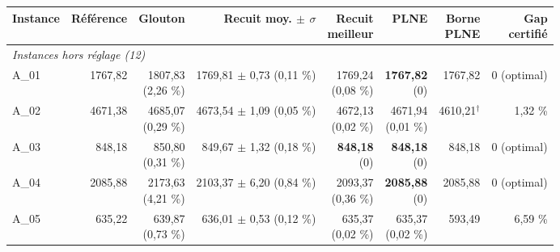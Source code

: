 \begin{tabular}{lrrrrrrr}
\toprule
Instance & Référence & Glouton & \makecell{Recuit\\ moy. $\pm$ $\sigma$} & \makecell{Recuit\\ meilleur} & PLNE & \makecell{Borne\\ PLNE} & \makecell{Gap\\ certifié} \\
\midrule
\multicolumn{8}{l}{\textit{Instances hors réglage (12)}} \\
\midrule
A\_01 & 1767,82 & \makecell{1807,83\\ \footnotesize(2,26 \%)} & \makecell{1769,81 $\pm$ 0,73\\ \footnotesize(0,11 \%)} & \makecell{1769,24\\ \footnotesize(0,08 \%)} & \makecell{\textbf{1767,82}\\ \footnotesize(0)} & 1767,82 & 0 (optimal) \\
A\_02 & 4671,38 & \makecell{4685,07\\ \footnotesize(0,29 \%)} & \makecell{4673,54 $\pm$ 1,09\\ \footnotesize(0,05 \%)} & \makecell{4672,13\\ \footnotesize(0,02 \%)} & \makecell{4671,94\\ \footnotesize(0,01 \%)} & 4610,21$^\dagger$ & 1,32 \% \\
A\_03 & 848,18 & \makecell{850,80\\ \footnotesize(0,31 \%)} & \makecell{849,67 $\pm$ 1,32\\ \footnotesize(0,18 \%)} & \makecell{\textbf{848,18}\\ \footnotesize(0)} & \makecell{\textbf{848,18}\\ \footnotesize(0)} & 848,18 & 0 (optimal) \\
A\_04 & 2085,88 & \makecell{2173,63\\ \footnotesize(4,21 \%)} & \makecell{2103,37 $\pm$ 6,20\\ \footnotesize(0,84 \%)} & \makecell{2093,37\\ \footnotesize(0,36 \%)} & \makecell{\textbf{2085,88}\\ \footnotesize(0)} & 2085,88 & 0 (optimal) \\
A\_05 & 635,22 & \makecell{639,87\\ \footnotesize(0,73 \%)} & \makecell{636,01 $\pm$ 0,53\\ \footnotesize(0,12 \%)} & \makecell{635,37\\ \footnotesize(0,02 \%)} & \makecell{635,37\\ \footnotesize(0,02 \%)} & 593,49 & 6,59 \% \\

\end{tabular}
